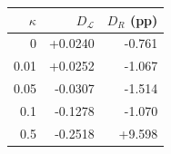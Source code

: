 \begin{tabular}{rrr}
\toprule
$\kappa$ & $D_{\mathcal L}$ & $D_R$ (pp) \\
\midrule
0 & +0.0240 & -0.761 \\
0.01 & +0.0252 & -1.067 \\
0.05 & -0.0307 & -1.514 \\
0.1 & -0.1278 & -1.070 \\
0.5 & -0.2518 & +9.598 \\
\bottomrule
\end{tabular}
